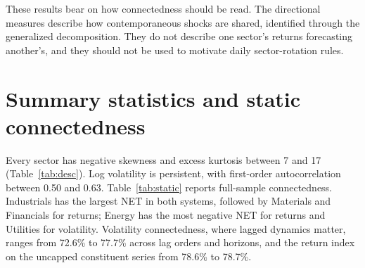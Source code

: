 \documentclass[11pt]{article}
\begin{document}
These results bear on how connectedness should be read. The directional measures describe how contemporaneous shocks are shared, identified through the generalized decomposition. They do not describe one sector's returns forecasting another's, and they should not be used to motivate daily sector-rotation rules.

\section{Summary statistics and static connectedness}\label{app:desc}
\setcounter{table}{0}

Every sector has negative skewness and excess kurtosis between 7 and 17 (Table~\ref{tab:desc}). Log volatility is persistent, with first-order autocorrelation between 0.50 and 0.63. Table~\ref{tab:static} reports full-sample connectedness. Industrials has the largest NET in both systems, followed by Materials and Financials for returns; Energy has the most negative NET for returns and Utilities for volatility. Volatility connectedness, where lagged dynamics matter, ranges from 72.6\% to 77.7\% across lag orders and horizons, and the return index on the uncapped constituent series from 78.6\% to 78.7\%.
\end{document}
